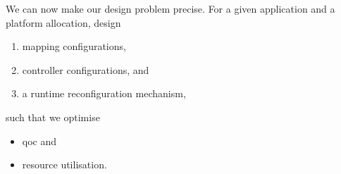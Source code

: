 We can now make our design problem precise. For a given application and a platform allocation, design  \begin{enumerate}
    \item mapping configurations,
    \item controller configurations, and
    \item a runtime reconfiguration mechanism,
  \end{enumerate} 
  such that we optimise\begin{itemize}
                                  \item \gls{qoc} and
                                  \item resource utilisation.
                                \end{itemize}